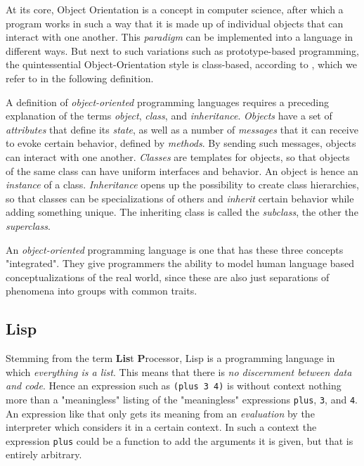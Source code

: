 \documentclass[oribibl]{llncs}
\begin{document}
At its core, Object Orientation is a concept in computer science, after which a program works in such a way that it is made up of individual objects that can interact with one another. This \emph{paradigm} can be implemented into a language in different ways. But next to such variations such as prototype-based programming, the quintessential Object-Orientation style is class-based, according to \cite{wegner1987dimensions}, which we refer to in the following  definition.

A definition of \emph{object-oriented} programming languages requires a preceding explanation of the terms \emph{object}, \emph{class}, and \emph{inheritance}. \emph{Objects} have a set of \emph{attributes} that define its \emph{state}, as well as a number of \emph{messages} that it can receive to evoke certain behavior, defined by \emph{methods}. By sending such messages, objects can interact with one another. \emph{Classes} are templates for objects, so that objects of the same class can have uniform interfaces and behavior. An object is hence an \emph{instance} of a class. \emph{Inheritance} opens up the possibility to create class hierarchies, so that classes can be specializations of others and \emph{inherit} certain behavior while adding something unique. The inheriting class is called the \emph{subclass}, the other the \emph{superclass}. \cite{wegner1987dimensions}

An \emph{object-oriented} programming language is one that has these three concepts "integrated". They give programmers the ability to model human language based conceptualizations of the real world, since these are also just separations of phenomena into groups with common traits.

\subsection{Lisp}
\label{sec:lisp}

Stemming from the term \textbf{Lis}t \textbf{P}rocessor, Lisp is a programming language in which \emph{everything is a list}. This means that there is \emph{no discernment between data and code}. Hence an expression such as \texttt{(plus 3 4)} is without context nothing more than a "meaningless" listing of the "meaningless" expressions \texttt{plus}, \texttt{3}, and \texttt{4}. An expression like that only gets its meaning from an \emph{evaluation} by the interpreter which considers it in a certain context. In such a context the expression \texttt{plus} could be a function to add the arguments it is given, but that is entirely arbitrary. 
\end{document}
